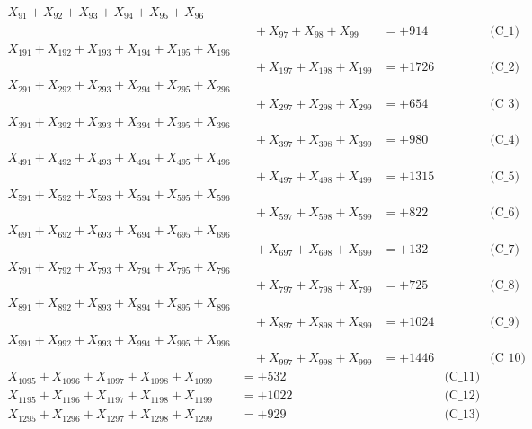 \documentclass[a4paper,10pt]{article}
\begin{document}
\allowdisplaybreaks
{\small
\begin{align}
X_{91} + X_{92} + X_{93} + X_{94} + X_{95} + X_{96} \\[0.1ex]
&\quad  + X_{97} + X_{98} + X_{99} &= +914 && \text{(C\_1)} \\
X_{191} + X_{192} + X_{193} + X_{194} + X_{195} + X_{196} \\[0.1ex]
&\quad  + X_{197} + X_{198} + X_{199} &= +1726 && \text{(C\_2)} \\
X_{291} + X_{292} + X_{293} + X_{294} + X_{295} + X_{296} \\[0.1ex]
&\quad  + X_{297} + X_{298} + X_{299} &= +654 && \text{(C\_3)} \\
X_{391} + X_{392} + X_{393} + X_{394} + X_{395} + X_{396} \\[0.1ex]
&\quad  + X_{397} + X_{398} + X_{399} &= +980 && \text{(C\_4)} \\
X_{491} + X_{492} + X_{493} + X_{494} + X_{495} + X_{496} \\[0.1ex]
&\quad  + X_{497} + X_{498} + X_{499} &= +1315 && \text{(C\_5)} \\
\allowbreak
X_{591} + X_{592} + X_{593} + X_{594} + X_{595} + X_{596} \\[0.1ex]
&\quad  + X_{597} + X_{598} + X_{599} &= +822 && \text{(C\_6)} \\
X_{691} + X_{692} + X_{693} + X_{694} + X_{695} + X_{696} \\[0.1ex]
&\quad  + X_{697} + X_{698} + X_{699} &= +132 && \text{(C\_7)} \\
X_{791} + X_{792} + X_{793} + X_{794} + X_{795} + X_{796} \\[0.1ex]
&\quad  + X_{797} + X_{798} + X_{799} &= +725 && \text{(C\_8)} \\
X_{891} + X_{892} + X_{893} + X_{894} + X_{895} + X_{896} \\[0.1ex]
&\quad  + X_{897} + X_{898} + X_{899} &= +1024 && \text{(C\_9)} \\
X_{991} + X_{992} + X_{993} + X_{994} + X_{995} + X_{996} \\[0.1ex]
&\quad  + X_{997} + X_{998} + X_{999} &= +1446 && \text{(C\_10)} \\
\allowbreak
X_{1095} + X_{1096} + X_{1097} + X_{1098} + X_{1099} &= +532 && \text{(C\_11)} \\
X_{1195} + X_{1196} + X_{1197} + X_{1198} + X_{1199} &= +1022 && \text{(C\_12)} \\
X_{1295} + X_{1296} + X_{1297} + X_{1298} + X_{1299} &= +929 && \text{(C\_13)} \\

\end{align}}
\end{document}
